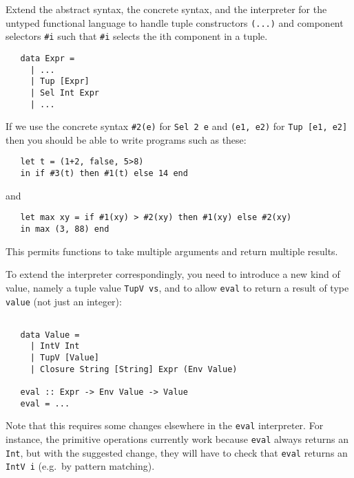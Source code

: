 \documentclass[a4paper]{article}
\begin{document}
\begin{exercise}\label{exer-fun-tuples-eval}
  Extend the abstract syntax, the concrete syntax, and the interpreter
  for the untyped functional language to handle tuple constructors
  \texttt{(...)} and component selectors \verb+#i+ such that \verb+#i+ selects the ith component in a tuple.

{\codesetup\begin{verbatim}
   data Expr = 
     | ...
     | Tup [Expr] 
     | Sel Int Expr
     | ...
\end{verbatim}}

\noindent
If we use the concrete syntax \verb+#2(e)+ for \texttt{Sel 2 e} and
\texttt{(e1, e2)} for \texttt{Tup [e1, e2]} then you should be able to
write programs such as these:

{\codesetup\begin{verbatim}
   let t = (1+2, false, 5>8)
   in if #3(t) then #1(t) else 14 end
\end{verbatim}}

\noindent
and

{\codesetup\begin{verbatim}
   let max xy = if #1(xy) > #2(xy) then #1(xy) else #2(xy) 
   in max (3, 88) end
\end{verbatim}}

\noindent
This permits functions to take multiple arguments and return multiple
results.

To extend the interpreter correspondingly, you need to introduce a new
kind of value, namely a tuple value \texttt{TupV vs}, and to allow
\texttt{eval} to return a result of type \texttt{value} (not just an
integer):

{\codesetup\begin{verbatim}

   data Value = 
     | IntV Int
     | TupV [Value]
     | Closure String [String] Expr (Env Value)
   
   eval :: Expr -> Env Value -> Value
   eval = ...
\end{verbatim}}

\noindent 
Note that this requires some changes elsewhere in the \texttt{eval}
interpreter.  For instance, the primitive operations currently work
because \texttt{eval} always returns an \texttt{Int}, but with the
suggested change, they will have to check that \texttt{eval} returns
an \texttt{IntV i} (e.g.\ by pattern matching).\\


\end{exercise}
\end{document}
